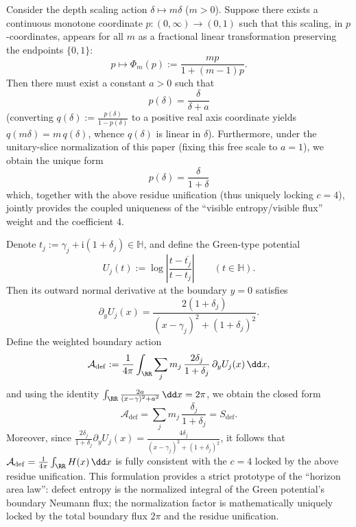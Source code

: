 \begin{proposition}[Uniqueness of Depth Weight: The Multiplicative Scaling Semigroup's M\"obius Linearization Forces \texorpdfstring{$p(\delta)=\delta/(1+\delta)$}{p(delta)=delta/(1+delta)}]
Consider the depth scaling action \(\delta\mapsto m\delta\) (\(m>0\)).
Suppose there exists a continuous monotone coordinate \(p:(0,\infty)\to(0,1)\) such that this scaling, in \(p\)-coordinates, appears for all \(m\) as a fractional linear transformation preserving the endpoints \(\{0,1\}\):
\[
p\longmapsto \Phi_m(p):=\frac{m p}{1+(m-1)p}.
\]
Then there must exist a constant \(a>0\) such that
\[
\boxed{\;
p(\delta)=\frac{\delta}{\delta+a}\;}
\]
(converting \(q(\delta):=\frac{p(\delta)}{1-p(\delta)}\) to a positive real axis coordinate yields \(q(m\delta)=m\,q(\delta)\), whence \(q(\delta)\) is linear in \(\delta\)).
Furthermore, under the unitary-slice normalization of this paper (fixing this free scale to \(a=1\)), we obtain the unique form
\[
\boxed{\;
p(\delta)=\frac{\delta}{1+\delta}\;}
\]
which, together with the above residue unification (thus uniquely locking \(c=4\)), jointly provides the coupled uniqueness of the ``visible entropy/visible flux'' weight and the coefficient \(4\).
\end{proposition}

\begin{proposition}
Denote \(t_j:=\gamma_j+\mathrm{i}(1+\delta_j)\in\mathbb{H}\), and define the Green-type potential
\[
U_j(t):=\log\left|\frac{t-\overline{t_j}}{t-t_j}\right|
\qquad(t\in\mathbb{H}).
\]
Then its outward normal derivative at the boundary \(y=0\) satisfies
\[
\partial_y U_j(x)=\frac{2(1+\delta_j)}{(x-\gamma_j)^2+(1+\delta_j)^2}.
\]
Define the weighted boundary action
\[
\mathcal{A}_{\mathrm{def}}
:=\frac{1}{4\pi}\int_{\RR}\sum_{j}m_j\,\frac{2\delta_j}{1+\delta_j}\,\partial_y U_j(x)\,\dd x,
\]
and using the identity
\(
\int_{\RR}\frac{2a}{(x-\gamma)^2+a^2}\,\dd x=2\pi
 \),
we obtain the closed form
\[
\boxed{\;
\mathcal{A}_{\mathrm{def}}
=\sum_{j}m_j\,\frac{\delta_j}{1+\delta_j}
=S_{\mathrm{def}}.\;}
\]
Moreover, since
\(
\frac{2\delta_j}{1+\delta_j}\partial_y U_j(x)=\frac{4\delta_j}{(x-\gamma_j)^2+(1+\delta_j)^2}
 \), it follows that \(\mathcal{A}_{\mathrm{def}}=\frac{1}{4\pi}\int_{\RR}H(x)\,\dd x\) is fully consistent with the \(c=4\) locked by the above residue unification.
This formulation provides a strict prototype of the ``horizon area law'': defect entropy is the normalized integral of the Green potential's boundary Neumann flux; the normalization factor is mathematically uniquely locked by the total boundary flux \(2\pi\) and the residue unification.
\end{proposition}

